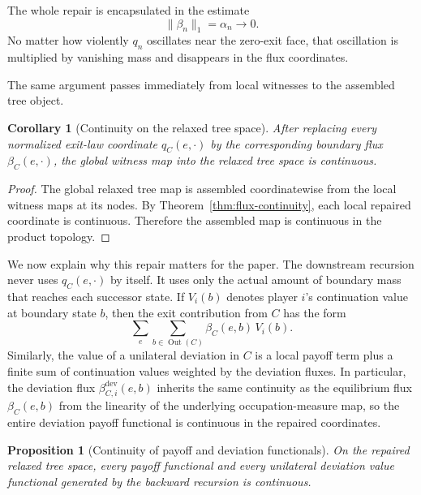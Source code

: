 \documentclass[12pt,a4paper]{article}
\newtheorem{proposition}[theorem]{Proposition}
\newtheorem{corollary}[theorem]{Corollary}
\theoremstyle{definition}
\DeclareMathOperator{\Out}{Out}
\begin{document}
The whole repair is encapsulated in the estimate
\[
\|\beta_n\|_1=\alpha_n\to 0.
\]
No matter how violently $q_n$ oscillates near the zero-exit face, that oscillation is multiplied by vanishing mass and disappears in the flux coordinates.

The same argument passes immediately from local witnesses to the assembled tree object.

\begin{corollary}[Continuity on the relaxed tree space]\label{cor:tree-continuity}
After replacing every normalized exit-law coordinate $q_C(e,\cdot)$ by the corresponding boundary flux $\beta_C(e,\cdot)$, the global witness map into the relaxed tree space is continuous.
\end{corollary}

\begin{proof}
The global relaxed tree map is assembled coordinatewise from the local witness maps at its nodes. By Theorem~\ref{thm:flux-continuity}, each local repaired coordinate is continuous. Therefore the assembled map is continuous in the product topology.
\end{proof}

We now explain why this repair matters for the paper. The downstream recursion never uses $q_C(e,\cdot)$ by itself. It uses only the actual amount of boundary mass that reaches each successor state. If $V_i(b)$ denotes player $i$'s continuation value at boundary state $b$, then the exit contribution from $C$ has the form
\[
\sum_e \sum_{b\in \Out(C)} \beta_C(e,b)\,V_i(b).
\]
Similarly, the value of a unilateral deviation in $C$ is a local payoff term plus a finite sum of continuation values weighted by the deviation fluxes.  In particular, the deviation flux $\beta_{C,i}^{\mathrm{dev}}(e,b)$ inherits the same continuity as the equilibrium flux $\beta_C(e,b)$ from the linearity of the underlying occupation-measure map, so the entire deviation payoff functional is continuous in the repaired coordinates.

\begin{proposition}[Continuity of payoff and deviation functionals]\label{prop:downstream-continuity}
On the repaired relaxed tree space, every payoff functional and every unilateral deviation value functional generated by the backward recursion is continuous.
\end{proposition}
\end{document}
